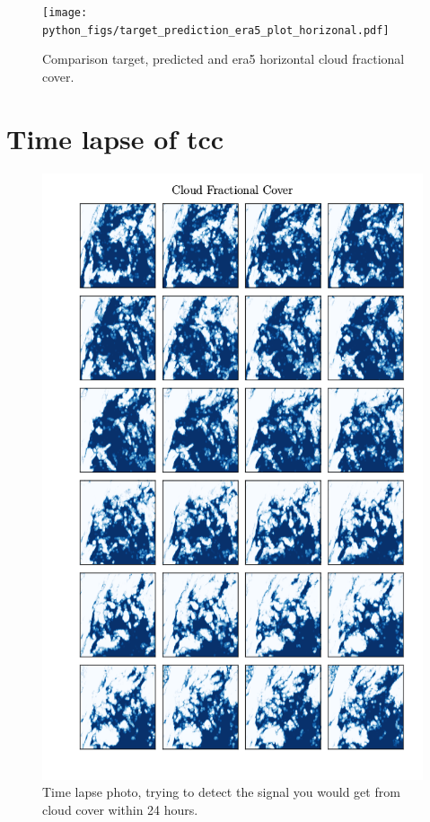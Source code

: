 \begin{figure}[ht]
    \centering
    \texttt{[image: python\_figs/target\_prediction\_era5\_plot\_horizonal.pdf]}
    \caption{Comparison target, predicted and era5 horizontal cloud fractional cover.}
    \label{fig:target_predict_era5_vertical}
\end{figure}

\cleardoublepage


\chapter{Time lapse of \acrlong{tcc}}

\begin{figure}[ht]
    \centering
    \includegraphics[scale=0.7]{python_figs/timelapse_cloud_cover_24hrs_from_2010-07-01.png}
    \caption{Time lapse photo, trying to detect the signal you would get from cloud cover within 24 hours.}
    \label{fig:time_lapse}
\end{figure}



